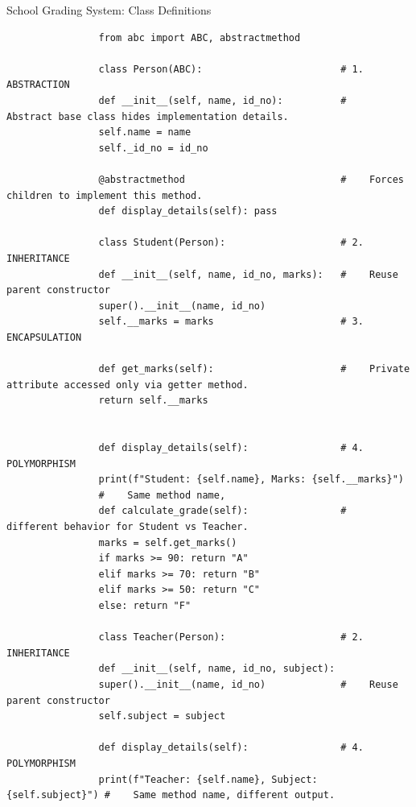 \documentclass{beamer}
\begin{document}
	\begin{frame}[fragile]{School Grading System: Class Definitions}
		
		{\fontsize{5.5}{6}\selectfont
			\begin{verbatim}
				from abc import ABC, abstractmethod
				
				class Person(ABC):                        # 1. ABSTRACTION
				def __init__(self, name, id_no):      	  #    Abstract base class hides implementation details.
				self.name = name                  		      
				self._id_no = id_no                 
				
				@abstractmethod                           #    Forces children to implement this method.
				def display_details(self): pass          
				
				class Student(Person):                    # 2. INHERITANCE
				def __init__(self, name, id_no, marks):   #    Reuse parent constructor
				super().__init__(name, id_no)     
				self.__marks = marks                      # 3. ENCAPSULATION
				
				def get_marks(self):                      #    Private attribute accessed only via getter method.
				return self.__marks                   
														   
				
				def display_details(self):                # 4. POLYMORPHISM
				print(f"Student: {self.name}, Marks: {self.__marks}")
				#    Same method name,
				def calculate_grade(self):                #    different behavior for Student vs Teacher.
				marks = self.get_marks()            
				if marks >= 90: return "A"
				elif marks >= 70: return "B"
				elif marks >= 50: return "C"
				else: return "F"
				
				class Teacher(Person):                    # 2. INHERITANCE
				def __init__(self, name, id_no, subject):
				super().__init__(name, id_no)             #    Reuse parent constructor
				self.subject = subject
				
				def display_details(self):                # 4. POLYMORPHISM
				print(f"Teacher: {self.name}, Subject: {self.subject}") #    Same method name, different output.
				
			\end{verbatim}
		}
		
	\end{frame}
	
\end{document}

